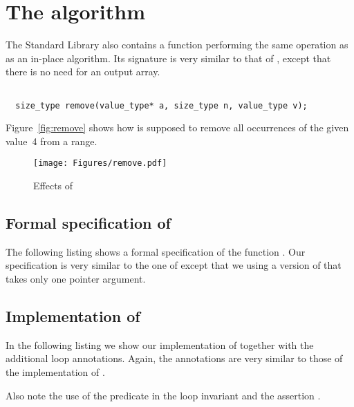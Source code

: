 
\section{The \remove algorithm}

The \cxx Standard Library also
contains a function \remove\cite[28.6.8]{cxx-17-draft} performing
the same operation as \removecopy as an in-place algorithm.
Its signature is very similar to that of \removecopy,
except that there is no need for an output array.

\begin{lstlisting}[style=acsl-block]

  size_type remove(value_type* a, size_type n, value_type v);
\end{lstlisting}

Figure~\ref{fig:remove} shows how \remove is supposed
to remove all occurrences of the given value~4 from a range.

\begin{figure}[hbt]
\centering
\texttt{[image: Figures/remove.pdf]}
\caption{Effects of \remove}
\end{figure}

\FloatBarrier

\subsection{Formal specification of \remove}

The following listing shows a formal specification of the function .
Our specification is very similar to the one of 
except that we using a version of  that takes only one pointer argument.



\clearpage

\subsection{Implementation of \remove}

In the following listing we show our implementation of  together with
the additional loop annotations.
Again, the annotations are very similar to those of the
implementation of .



Also note the use of the predicate  in the loop invariant 
and the assertion .

\clearpage

